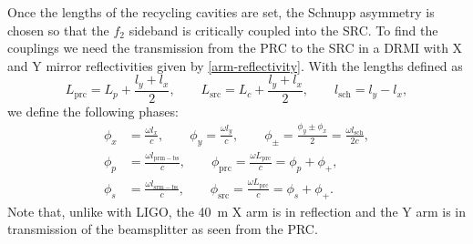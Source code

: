\documentclass[12pt]{article}
\newcommand{\mr}[1]{\mathrm{#1}}
\begin{document}
Once the lengths of the recycling cavities are set, the Schnupp asymmetry is chosen so that the $f_2$ sideband is critically coupled into the SRC. To find the couplings we need the transmission from the PRC to the SRC in a DRMI with X and Y mirror reflectivities given by \eqref{arm-reflectivity}. With the lengths defined as
\begin{equation}
L_\mr{prc} = L_p + \frac{l_y + l_x}{2},\qquad
L_\mr{src} = L_c + \frac{l_y + l_x}{2}, \qquad
l_\mr{sch} = l_y - l_x,
\end{equation}
we define the following phases:
\begin{subequations}
\begin{align}
\phi_x &= \frac{\omega l_x}{c}, \qquad
\phi_y = \frac{\omega l_y}{c}, \qquad
\phi_\pm = \frac{\phi_y \pm \phi_x}{2} = \frac{\omega l_\mr{sch}}{2c}, \\
\phi_p &= \frac{\omega l_\mr{prm-bs}}{c}, \qquad
\phi_\mr{prc} = \frac{\omega L_\mr{prc}}{c} = \phi_p + \phi_+, \\
\phi_s &= \frac{\omega l_\mr{srm-bs}}{c}, \qquad
\phi_\mr{src} = \frac{\omega L_\mr{prc}}{c} = \phi_s + \phi_+.
\end{align}
\end{subequations}
Note that, unlike with LIGO, the 40~m X arm is in reflection and the Y arm is in transmission of the beamsplitter as seen from the PRC.
\end{document}
